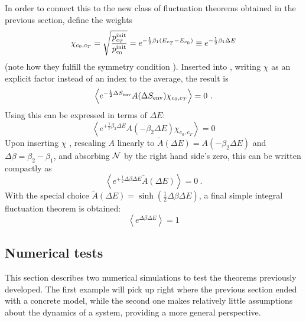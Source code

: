 In order to connect this to the new class of fluctuation theorems obtained in the previous section, define the weights
%
\begin{equation}
	\label{eqn:chi example value}
	  \chi_{c_0,c_T}
	= \sqrt{\frac{p_{c_T}^{\text{init}}}{p_{c_0}^{\text{init}}}}
	= e^{-\frac12\beta_1(E_{c_T} - E_{c_0})}
	\equiv e^{-\frac12\beta_1\Delta E}
\end{equation}
%
(note how they fulfill the symmetry condition ). Inserted into , writing \(\chi\) as an explicit factor instead of an index to the average, the result is
%
\begin{equation}
	\left\langle e^{-\frac12\Delta S_\text{env}} A(\Delta S_\text{env}) \chi_{c_0,c_T} \right\rangle = 0 ~.
\end{equation}
%
Using  this can be expressed in terms of \(\Delta E\):
%
\begin{equation}
	\left\langle e^{+\frac12\beta_2\Delta E} A(-\beta_2\Delta E) \chi_{c_0,c_T} \right\rangle = 0
\end{equation}
%
Upon inserting \(\chi\) , rescaling \(A\) linearly to \(\tilde A(\Delta E) = A(-\beta_2\Delta E)\) and \(\Delta\beta = \beta_2-\beta_1\), and absorbing \(\mathcal{N}\) by the right hand side's zero, this can be written compactly as
%
\begin{equation}
	\left\langle e^{+\frac12\Delta\beta\Delta E} \tilde A(\Delta E) \right\rangle = 0 ~.
\end{equation}
%
With the special choice \(\tilde A(\Delta E) = \sinh(\frac12\Delta\beta\Delta E)\), a final simple integral fluctuation theorem is obtained:
%
\begin{equation}
	\boxed{\left\langle e^{\Delta\beta \Delta E}\right\rangle = 1}
\end{equation}









\subsection{Numerical tests}

This section describes two numerical simulations to test the theorems previously developed. The first example will pick up right where the previous section ended with a concrete model, while the second one makes relatively little assumptions about the dynamics of a system, providing a more general perspective.


